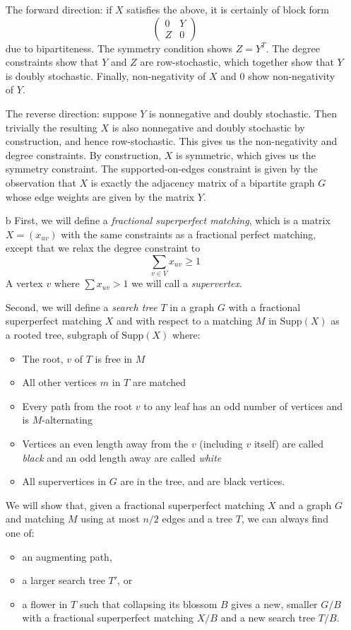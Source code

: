 \documentclass{hmcpset}
\begin{document}
\begin{solution}
\begin{enumerate}
The forward direction: if $X$ satisfies the above, it is certainly of block form
\[\begin{pmatrix} 0 & Y \\ Z & 0\end{pmatrix}\]
due to bipartiteness. The symmetry condition shows $Z=Y^T$. The degree constraints show that $Y$ and $Z$ are row-stochastic, which together show that $Y$ is doubly stochastic. Finally, non-negativity of $X$ and $0$ show non-negativity of $Y$.

The reverse direction: suppose $Y$ is nonnegative and doubly stochastic. Then trivially the resulting $X$ is also nonnegative and doubly stochastic by construction, and hence row-stochastic. This gives us the non-negativity and degree constraints. By construction, $X$ is symmetric, which gives us the symmetry constraint. The supported-on-edges constraint is given by the observation that $X$ is exactly the adjacency matrix of a bipartite graph $G$ whose edge weights are given by the matrix $Y$.

\item[b] First, we will define a \emph{fractional superperfect matching}, which is a matrix $X=(x_{uv})$ with the same constraints as a fractional perfect matching, except that we relax the degree constraint to
\[\sum_{v\in V} x_{uv} \geq 1\]
A vertex $v$ where $\sum x_{uv} > 1$ we will call a \emph{supervertex}.

Second, we will define a \emph{search tree} $T$ in a graph $G$ with a fractional superperfect matching $X$ and with respect to a matching $M$ in $\text{Supp}(X)$ as a rooted tree, subgraph of $\text{Supp}(X)$ where:
\begin{itemize}
\item The root, $v$ of $T$ is free in $M$
\item All other vertices $m$ in $T$ are matched
\item Every path from the root $v$ to any leaf has an odd number of vertices and is $M$-alternating
\item Vertices an even length away from the $v$ (including $v$ itself) are called \emph{black} and an odd length away are called \emph{white}
\item All supervertices in $G$ are in the tree, and are black vertices.
\end{itemize}

We will show that, given a fractional superperfect matching $X$ and a graph $G$ and matching $M$ using at most $n/2$ edges and a tree $T$, we can always find one of:
\begin{itemize} 
\item an augmenting path,
\item a larger search tree $T'$, or
\item a flower in $T$ such that collapsing its blossom $B$ gives a new, smaller $G/B$ with a fractional superperfect matching $X/B$ and a new search tree $T/B$.
\end{itemize}


\end{enumerate}
\end{solution}
\end{document}
